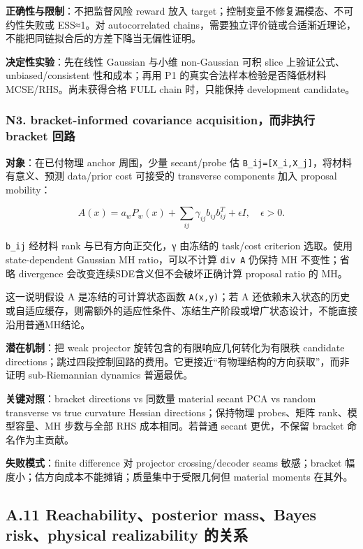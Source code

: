 \documentclass[
  11pt,
  a4paper,
]{article}
\begin{document}
\textbf{正确性与限制}：不把监督风险 reward 放入
target；控制变量不修复漏模态、不可约性失败或 ESS≈1。对 autocorrelated
chains，需要独立评价链或合适渐近理论，不能把同链拟合后的方差下降当无偏性证明。

\textbf{决定性实验}：先在线性 Gaussian 与小维 non-Gaussian 可积 slice
上验证公式、unbiased/consistent 性和成本；再用 P1
的真实合法样本检验是否降低材料 MCSE/RHS。尚未获得合格 FULL chain
时，只能保持 development candidate。

\hypertarget{n3.-bracket-informed-covariance-acquisitionux800cux975eux6267ux884c-bracket-ux56deux8def}{%
\subsubsection{N3. bracket-informed covariance acquisition，而非执行
bracket
回路}\label{n3.-bracket-informed-covariance-acquisitionux800cux975eux6267ux884c-bracket-ux56deux8def}}

\textbf{对象}：在已付物理 anchor 周围，少量 secant/probe 估
\texttt{B\_\allowbreak{}ij={[}X\_\allowbreak{}i,X\_\allowbreak{}j{]}}，将材料有意义、预测 data/prior cost
可接受的 transverse components 加入 proposal mobility：

\[
A(x)=a_wP_w(x)+\sum_{ij}\gamma_{ij}b_{ij}b_{ij}^T+\epsilon I,
\quad \epsilon>0.
\]

\nolinkurl{b_ij} 经材料 rank 与已有方向正交化，γ 由冻结的 task/cost
criterion 选取。使用 state-dependent Gaussian MH ratio，可以不计算
\texttt{div\ A} 仍保持 MH 不变性；省略 divergence
会改变连续SDE含义但不会破坏正确计算 proposal ratio 的 MH。

这一说明假设 A 是冻结的可计算状态函数 \texttt{A(x,y)}；若 A
还依赖未入状态的历史或自适应缓存，则需额外的适应性条件、冻结生产阶段或增广状态设计，不能直接沿用普通MH结论。

\textbf{潜在机制}：把 weak projector 旋转包含的有限响应几何转化为有限秩
candidate
directions；跳过四段控制回路的费用。它更接近``有物理结构的方向获取''，而非证明
sub-Riemannian dynamics 普遍最优。

\textbf{关键对照}：bracket directions vs 同数量 material secant PCA vs
random transverse vs true curvature Hessian directions；保持物理
probes、矩阵 rank、模型容量、MH 步数与全部 RHS 成本相同。若普通 secant
更优，不保留 bracket 命名作为主贡献。

\textbf{失败模式}：finite difference 对 projector crossing/decoder seams
敏感；bracket 幅度小；估方向成本不能摊销；质量集中于受限几何但 material
moments 在其外。

\hypertarget{a.11-reachabilityposterior-massbayes-riskphysical-realizability-ux7684ux5173ux7cfb}{%
\subsection{A.11 Reachability、posterior mass、Bayes risk、physical
realizability
的关系}\label{a.11-reachabilityposterior-massbayes-riskphysical-realizability-ux7684ux5173ux7cfb}}
\end{document}
